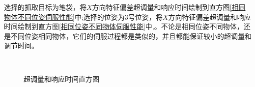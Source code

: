 \documentclass[fontset=fandol,type=bachelor,campus=harbin,bsmainpagenumberline=true]{hithesisbook}
\begin{document}
选择的抓取目标为笔袋，将$X$方向特征偏差超调量和响应时间绘制到直方图\ref{相同物体不同位姿伺服性能}中;选择的位姿为3号位姿，将$X$方向特征偏差超调量和响应时间绘制到直方图\ref{相同位姿不同物体伺服性能}中,。不论是相同位姿不同物体，还是不同位姿相同物体，它们的伺服过程都是类似的，并且都能保证较小的超调量和调节时间。
\begin{figure}[h]
	\centering
	\\ 

	\caption{超调量和响应时间直方图}
	\label{伺服性能超调量和响应时间直方图}
\end{figure}
\end{document}
